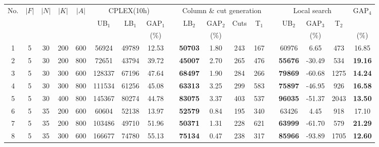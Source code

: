 \documentclass[11pt,nonblindrev,fleqn]{article}
\begin{document}
\begin{table}[H]
\begin{tabular}{cccccccccccccccccc}
\hline
\multirow{3}[4]{*}{No.} & \multirow{3}[4]{*}{$|F|$} & \multirow{3}[4]{*}{$|N|$} & \multirow{3}[4]{*}{$|K|$} & \multirow{3}[4]{*}{$|A|$} & \multicolumn{3}{c}{CPLEX(10h)} & \multirow{3}[4]{*}{} & \multicolumn{4}{c}{Column \& cut generation } & \multirow{3}[4]{*}{} & \multicolumn{3}{c}{Local search} & \multirow{2}[3]{*}{
GAP$_4$} \bigstrut\\
\cline{6-8}\cline{10-13}\cline{15-17}      &       &       &       &       & \multirow{2}[2]{*}{UB$_1$} & \multirow{2}[2]{*}{LB$_1$} & GAP$_1$ &       & \multirow{2}[2]{*}{LB$_2$} & GAP$_2$ & \multirow{2}[2]{*}{Cuts} & \multirow{2}[2]{*}{T$_1$} &       & \multirow{2}[2]{*}{UB$_2$} & GAP$_3$ & \multirow{2}[2]{*}{T$_2$} &  \bigstrut[t]\\
      &       &       &       &       &       &       & (\%)  &       &       & (\%)  &       &       &       &       & (\%)  &       & (\%) \bigstrut[b]\\
\hline
1     & 5     & 30    & 200   & 600   & 56924 & 49789 & 12.53  &       & \textbf{50703 } & 1.80  & 243   & 167   &       & 60976 & 6.65  & 473   & 16.85  \bigstrut[t]\\
2     & 5     & 30    & 200   & 800   & 72651 & 43794 & 39.72  &       & \textbf{45007 } & 2.70  & 265   & 476   &       & \textbf{55676} & -30.49  & 534   & \textbf{19.16 } \\
3     & 5     & 30    & 300   & 600   & 128337 & 67196 & 47.64  &       & \textbf{68497 } & 1.90  & 284   & 266   &       & \textbf{79869} & -60.68  & 1275  & \textbf{14.24 } \\
4     & 5     & 30    & 300   & 800   & 111534 & 61256 & 45.08  &       & \textbf{63313 } & 3.25  & 299   & 583   &       & \textbf{75897} & -46.95  & 926   & \textbf{16.58 } \\
5     & 5     & 30    & 400   & 800   & 145367 & 80274 & 44.78  &       & \textbf{83075 } & 3.37  & 403   & 537   &       & \textbf{96035} & -51.37  & 2043  & \textbf{13.50 } \\
6     & 5     & 35    & 200   & 600   & 60604 & 52138 & 13.97  &       & \textbf{52579 } & 0.84  & 195   & 340   &       & 63426 & 4.45  & 918   & 17.10  \\
7     & 5     & 35    & 200   & 800   & 103486 & 49710 & 51.96  &       & \textbf{50371 } & 1.31  & 228   & 621   &       & \textbf{63999} & -61.70  & 579   & \textbf{21.29 } \\
8     & 5     & 35    & 300   & 600   & 166677 & 74780 & 55.13  &       & \textbf{75134 } & 0.47  & 238   & 317   &       & \textbf{85966} & -93.89  & 1705  & \textbf{12.60 } \\

\end{tabular}
\end{table}
\end{document}
